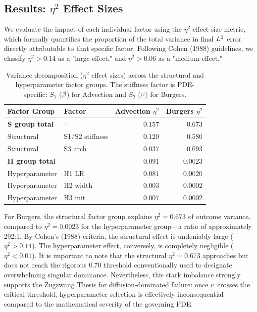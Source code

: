 \subsection{Results: \texorpdfstring{$\eta^2$}{eta-squared} Effect Sizes}

We evaluate the impact of each individual factor using the $\eta^2$ effect size metric, which formally quantifies the proportion of the total variance in final $L^2$ error directly attributable to that specific factor. Following Cohen (1988) guidelines, we classify $\eta^2 > 0.14$ as a "large effect," and $\eta^2 > 0.06$ as a "medium effect."

\begin{table}[htpb]
    \centering
    \caption{Variance decomposition ($\eta^2$ effect sizes) across the structural and hyperparameter factor groups. The stiffness factor is PDE-specific: $S_1$ ($\beta$) for Advection and $S_2$ ($\nu$) for Burgers.}
    \label{tab:exp27_eta2}
    \begin{tabular}{@{}llrr@{}}
        \toprule
        Factor Group & Factor & Advection $\eta^2$ & Burgers $\eta^2$ \\
        \midrule
        \textbf{S group total} & -- & $0.157$ & $0.673$ \\
        Structural & S1/S2 stiffness & $0.120$ & $0.580$ \\
        Structural & S3 arch & $0.037$ & $0.093$ \\
        \midrule
        \textbf{H group total} & -- & $0.091$ & $0.0023$ \\
        Hyperparameter & H1 LR & $0.081$ & $0.0020$ \\
        Hyperparameter & H2 width & $0.003$ & $0.0002$ \\
        Hyperparameter & H3 init & $0.007$ & $0.0002$ \\
        \bottomrule
    \end{tabular}
\end{table}

For Burgers, the structural factor group explains $\eta^2=0.673$ of outcome variance, compared to $\eta^2=0.0023$ for the hyperparameter group—a ratio of approximately 292:1. By Cohen's (1988) criteria, the structural effect is undeniably large ($\eta^2 > 0.14$). The hyperparameter effect, conversely, is completely negligible ($\eta^2 < 0.01$). It is important to note that the structural $\eta^2=0.673$ approaches but does not reach the rigorous $0.70$ threshold conventionally used to designate overwhelming singular dominance. Nevertheless, this stark imbalance strongly supports the Zugzwang Thesis for diffusion-dominated failure: once $\nu$ crosses the critical threshold, hyperparameter selection is effectively inconsequential compared to the mathematical severity of the governing PDE.

